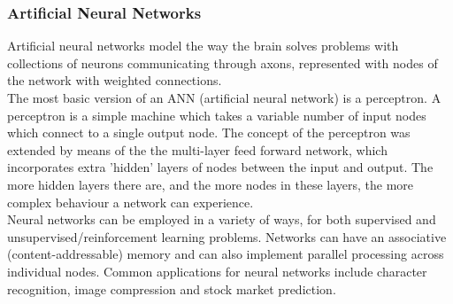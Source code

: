 \documentclass[11pt,a4paper]{article}
\begin{document}
\subsubsection{Artificial Neural Networks}
Artificial neural networks model the way the brain solves problems with collections of neurons communicating through axons, represented with nodes of the network with weighted connections. \\

The most basic version of an ANN (artificial neural network) is a perceptron. A perceptron is a simple machine which takes a variable number of input nodes which connect to a single output node. \cite{percept} The concept of the perceptron was extended by means of the the multi-layer feed forward network, which incorporates extra 'hidden' layers of nodes between the input and output. The more hidden layers there are, and the more nodes in these layers, the more complex behaviour a network can experience. \cite{ffann}\\

Neural networks can be employed in a variety of ways, for both supervised and unsupervised/reinforcement learning problems. Networks can have an associative (content-addressable) memory and can also implement parallel processing across individual nodes. \cite{nnm} Common applications for neural networks include character recognition, image compression and stock market prediction. \cite{nnapps}
\begin{figure}[h]
\end{figure}
\newpage
\end{document}
